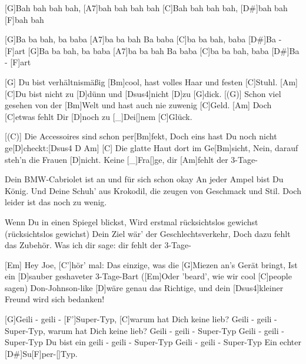
\chordscheme[%
	name = C',%
	finger = {1/2, 2/4, 3/5},%
	ring = {1, 3}]
\chordscheme[%
	name = F',%
	barre = {1/1-6},%
	finger = {2/3, 3/4, 3/5}]

\begin{guitar}
	[G]Bah bah bah bah, [A7]bah bah bah bah
	[C]Bah bah bah bah, [D#]bah bah [F]bah bah
	
	[G]Ba ba bah, ba baba [A7]ba ba bah
	Ba baba [C]ba ba bah, baba [D#]Ba - [F]art
	[G]Ba ba bah, ba baba [A7]ba ba bah
	Ba baba [C]ba ba bah, baba [D#]Ba - [F]art
	
	[G] Du bist verhältnismäßig [Bm]cool, hast volles Haar und festen [C]Stuhl. [Am]{}
	[C]Du bist nicht zu [D]dünn und [{\color{gray}Dsus4}]nicht [{\color{gray}D}]zu [G]dick.
	[(G)] Schon viel gesehen von der [Bm]Welt und hast auch nie zuwenig [C]Geld. [Am]{}
	Doch [C]etwas fehlt Dir [D]noch zu [_]{Dei}[]nem [C]Glück.
	
	[(C)] Die Accessoires sind schon per[Bm]fekt, 
	Doch eins hast Du noch nicht ge[D]checkt:[{\color{gray}Dsus4 D}  Am]{}
	[C] Die glatte Haut dort im Ge[Bm]sicht, 
	Nein, darauf steh'n die Frauen [D]nicht. Keine [_]{Fra}[]ge, dir [Am]fehlt der 3-Tage-
	
	 
	
	Dein BMW-Cabriolet ist an und für sich schon okay
	An jeder Ampel bist Du König.
	Und Deine Schuh' aus Krokodil, die zeugen von Geschmack und Stil.
	Doch leider ist das noch zu wenig.
	
	\pagebreak
	Wenn Du in einen Spiegel blickst,
	Wird erstmal rücksichtslos gewichst (rücksichtslos gewichst)
	Dein Ziel wär' der Geschlechtsverkehr,
	Doch dazu fehlt das Zubehör. Was ich dir sage: dir fehlt der 3-Tage-
	
	 
	
	[Em] Hey Joe, [C']hör' mal:
	Das einzige, was die [G]Miezen an's Gerät bringt,
	Ist ein [D]sauber geshaveter 3-Tage-Bart
	([Em]Oder 'beard', wie wir cool [C]people sagen)
	Don-Johnson-like [D]wäre genau das Richtige, 
	und dein [Dsus4]kleiner Freund wird sich bedanken!
	
	[G]Geili - geili - [F']Super-Typ, [C]warum hat Dich keine lieb?
	Geili - geili - Super-Typ, warum hat Dich keine lieb?
	Geili - geili - Super-Typ
	Geili - geili - Super-Typ
	Du bist ein geili - geili - Super-Typ
	Geili - geili - Super-Typ
	Ein echter [D#]Su[F]per-[]Typ.
	
\end{guitar}